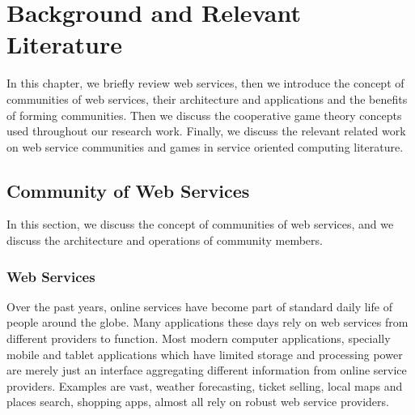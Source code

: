\setcounter{chapter}{1}

\chapter{Background and Relevant Literature}\label{sec:MAS}

In this chapter, we briefly review web services, then we introduce the concept of communities of web services, their architecture and applications and the benefits of forming communities. Then we discuss the cooperative game theory concepts used throughout our research work. Finally, we discuss the relevant related work on web service communities and games in service oriented computing literature.

    \section{Community of Web Services}\label{sec:CommunityWS}
    In this section, we discuss the concept of communities of web services, and we discuss the architecture and operations of community members.  
        
        \subsection{Web Services}\label{sec:CWSWebServices}
        Over the past years, online services have become part of standard daily life of people around the globe. Many applications these days rely on 
        web services from different providers to function. Most modern computer applications, specially 
        mobile and tablet applications which have limited storage and processing power
        are merely just an interface aggregating different information from online service providers.
        Examples are vast, weather forecasting, ticket selling, local maps and places search, shopping apps, almost all rely on
        robust web service providers. 
        
